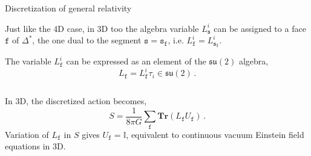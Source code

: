 \documentclass{beamer}
\begin{document}
\begin{frame}{Discretization of general relativity}
    \begin{list}{\maltese}{\leftmargin=1em \itemindent=0em}
        \item<1-> Just like the 4D case, in 3D too the algebra variable $L_\mathtt{s}^i$ can be assigned to a face $\mathtt{f}$ of $\Delta^\text{*}$, the one dual to the segment $\mathtt{s}=\mathtt{s_f}$, i.e. $L_\mathtt{f}^i=L_\mathtt{s_f}^i$.
        \item<2-> The variable $L_\mathtt{f}^i$ can be expressed as an element of the $\mathfrak{su}(2)$ algebra,
        \begin{equation}
            L_\mathtt{f}=L_\mathtt{f}^i \tau_i \in\mathfrak{su}(2)\,.
        \end{equation}
        \item<3-> \noindent
        \begin{minipage}{\linewidth}
            \begin{columns}
            \end{columns}
        \end{minipage}
        \item<4-> In 3D, the discretized action becomes,
        \begin{equation}
            S=\frac{1}{8\pi G}\sum_\mathtt{f} \mathbf{Tr}(L_\mathtt{f} U_\mathtt{f})\,.
        \end{equation}
        Variation of $L_\mathtt{f}$ in $S$ gives $U_\mathtt{f}=\mathbb{I}$, equivalent to continuous vacuum Einstein field equations in 3D.
    \end{list}
\end{frame}
\end{document}
